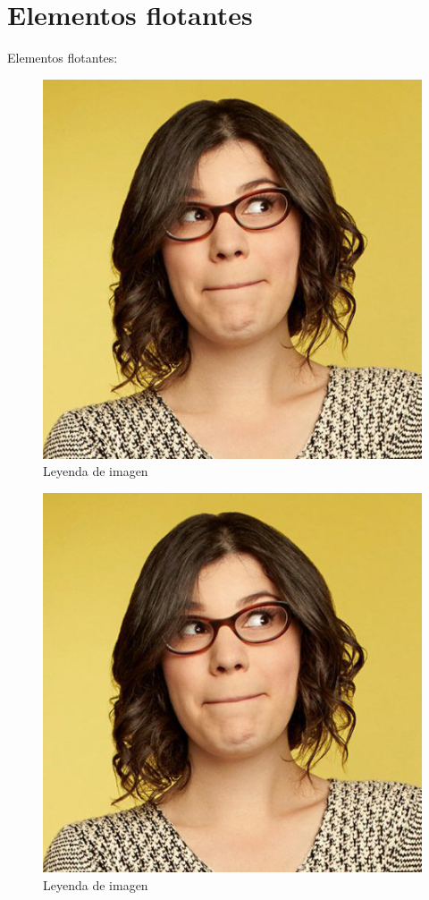 \documentclass{article}     %
\begin{document}
    \section{Elementos flotantes}

    Elementos flotantes:
    \begin{figure}[ht]
        \centering
        \includegraphics[scale = .4]{images/portada.jpg}
        \caption{Leyenda de imagen}
    \end{figure}

    \begin{figure}[ht]
        \centering
        \includegraphics[scale = .3]{portada}
        \caption{Leyenda de imagen}
    \end{figure}
\end{document}
